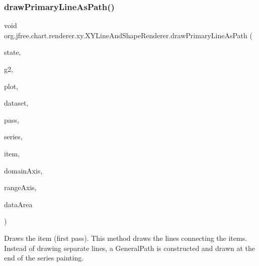 \subsubsection{\texorpdfstring{draw\+Primary\+Line\+As\+Path()}{drawPrimaryLineAsPath()}}
{\footnotesize\ttfamily void org.\+jfree.\+chart.\+renderer.\+xy.\+X\+Y\+Line\+And\+Shape\+Renderer.\+draw\+Primary\+Line\+As\+Path (\begin{DoxyParamCaption}\item[{\mbox{\hyperlink{classorg_1_1jfree_1_1chart_1_1renderer_1_1xy_1_1_x_y_item_renderer_state}{X\+Y\+Item\+Renderer\+State}}}]{state,  }\item[{Graphics2D}]{g2,  }\item[{\mbox{\hyperlink{classorg_1_1jfree_1_1chart_1_1plot_1_1_x_y_plot}{X\+Y\+Plot}}}]{plot,  }\item[{\mbox{\hyperlink{interfaceorg_1_1jfree_1_1data_1_1xy_1_1_x_y_dataset}{X\+Y\+Dataset}}}]{dataset,  }\item[{int}]{pass,  }\item[{int}]{series,  }\item[{int}]{item,  }\item[{\mbox{\hyperlink{classorg_1_1jfree_1_1chart_1_1axis_1_1_value_axis}{Value\+Axis}}}]{domain\+Axis,  }\item[{\mbox{\hyperlink{classorg_1_1jfree_1_1chart_1_1axis_1_1_value_axis}{Value\+Axis}}}]{range\+Axis,  }\item[{Rectangle2D}]{data\+Area }\end{DoxyParamCaption})\hspace{0.3cm}{\ttfamily [protected]}}

Draws the item (first pass). This method draws the lines connecting the items. Instead of drawing separate lines, a General\+Path is constructed and drawn at the end of the series painting.


